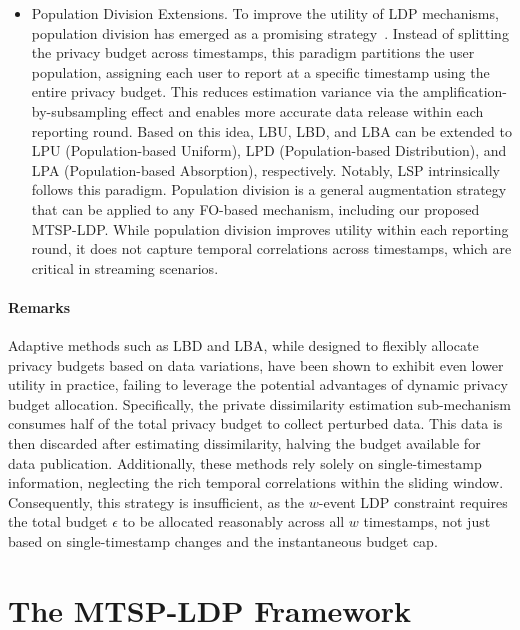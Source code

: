 \documentclass[acmsmall]{acmart}
\begin{document}
\begin{itemize}
\item{Population Division Extensions.}
To improve the utility of LDP mechanisms, population division has emerged as a
promising strategy~\cite{Kulkarni2019,Wang2017l,Ren2022}.
Instead of splitting the privacy budget across timestamps, this paradigm
partitions the user population, assigning each user to report at a specific
timestamp using the entire privacy budget.
This reduces estimation variance via the amplification-by-subsampling effect and
enables more accurate data release within each reporting round.
Based on this idea, LBU, LBD, and LBA can be extended to LPU (Population-based
Uniform), LPD (Population-based Distribution), and LPA (Population-based
Absorption), respectively.
Notably, LSP intrinsically follows this paradigm.
Population division is a general augmentation strategy that can be applied to
any FO-based mechanism, including our proposed MTSP-LDP.
While population division improves utility within each reporting round, it does
not capture temporal correlations across timestamps, which are critical in
streaming scenarios.
\end{itemize}
\paragraph{Remarks}
Adaptive methods such as LBD and LBA, while designed to flexibly allocate
privacy budgets based on data variations, have been shown to exhibit even lower
utility in practice\cite{Schaler2024}, failing to leverage the potential
advantages of dynamic privacy budget allocation.
Specifically, the private dissimilarity estimation sub-mechanism consumes half
of the total privacy budget to collect perturbed data.
This data is then discarded after estimating dissimilarity, halving the budget
available for data publication.
Additionally, these methods rely solely on single-timestamp information,
neglecting the rich temporal correlations within the sliding window.
Consequently, this strategy is insufficient, as the $w$-event LDP constraint
requires the total budget $\epsilon$ to be allocated reasonably across all $w$
timestamps, not just based on single-timestamp changes and the instantaneous
budget cap.






\section{The MTSP-LDP Framework}
\label{sec:method}
\end{document}
